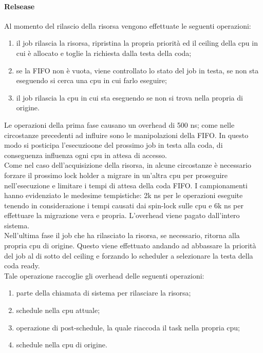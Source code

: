 \paragraph{Relsease} Al momento del rilascio della risorsa vengono effettuate le seguenti operazioni:

\begin{enumerate}
	\item il job rilascia la risorsa, ripristina la propria priorità ed il ceiling della cpu in cui è allocato e toglie la richiesta dalla testa della coda;
	\item se la FIFO non è vuota, viene controllato lo stato del job in testa, se non sta eseguendo si cerca una cpu in cui farlo eseguire;
	\item il job rilascia la cpu in cui sta eseguendo se non si trova nella propria di origine.
\end{enumerate}

\noindent Le operazioni della prima fase causano un overhead di 500 ns; come nelle circostanze precedenti ad influire sono le manipolazioni della FIFO. In questo modo si posticipa l'esecuzioone del prossimo job in testa alla coda, di conseguenza influenza ogni cpu in attesa di accesso.\\

\noindent Come nel caso dell'acquisizione della risorsa, in alcune circostanze è necessario forzare il prossimo lock holder a migrare in un'altra cpu per proseguire nell'esecuzione e limitare i tempi di attesa della coda FIFO. I campionamenti hanno evidenziato le medesime tempistiche: 2k ns per le operazioni eseguite tenendo in considerazione i tempi causati dai spin-lock sulle cpu e 6k ns per effettuare la migrazione vera e propria. L'overhead viene pagato dall'intero sistema.\\

\noindent Nell'ultima fase il job che ha rilasciato la risorsa, se necessario, ritorna alla propria cpu di origine. Questo viene effettuato andando ad abbassare la priorità del job al di sotto del ceiling e forzando lo scheduler a selezionare la testa della coda ready.\\

\noindent Tale operazione raccoglie gli overhead delle seguenti operazioni:

\begin{enumerate}
	\item parte della chiamata di sistema per rilasciare la risorsa;
	\item schedule nella cpu attuale;
	\item operazione di post-schedule, la quale riaccoda il task nella propria cpu;
	\item schedule nella cpu di origine.
\end{enumerate}

